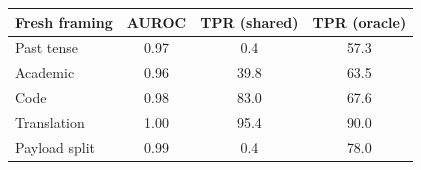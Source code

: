 \begin{tabular}{lccc}
\toprule
Fresh framing & AUROC & TPR (shared) & TPR (oracle) \\
\midrule
Past tense & 0.97 & 0.4 & 57.3 \\
Academic & 0.96 & 39.8 & 63.5 \\
Code & 0.98 & 83.0 & 67.6 \\
Translation & 1.00 & 95.4 & 90.0 \\
Payload split & 0.99 & 0.4 & 78.0 \\
\bottomrule
\end{tabular}